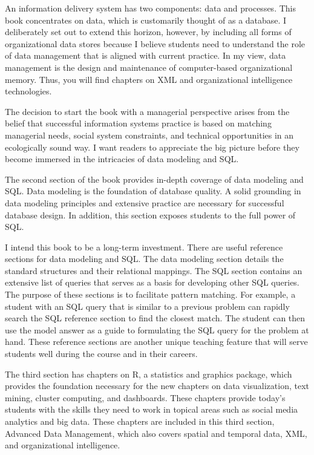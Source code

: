 \documentclass[
]{article}
\begin{document}
An information delivery system has two components: data and processes.
This book concentrates on data, which is customarily thought of as a
database. I deliberately set out to extend this horizon, however, by
including all forms of organizational data stores because I believe
students need to understand the role of data management that is aligned
with current practice. In my view, data management is the design and
maintenance of computer-based organizational memory. Thus, you will find
chapters on XML and organizational intelligence technologies.

The decision to start the book with a managerial perspective arises from
the belief that successful information systems practice is based on
matching managerial needs, social system constraints, and technical
opportunities in an ecologically sound way. I want readers to appreciate
the big picture before they become immersed in the intricacies of data
modeling and SQL.

The second section of the book provides in-depth coverage of data
modeling and SQL. Data modeling is the foundation of database quality. A
solid grounding in data modeling principles and extensive practice are
necessary for successful database design. In addition, this section
exposes students to the full power of SQL.

I intend this book to be a long-term investment. There are useful
reference sections for data modeling and SQL. The data modeling section
details the standard structures and their relational mappings. The SQL
section contains an extensive list of queries that serves as a basis for
developing other SQL queries. The purpose of these sections is to
facilitate pattern matching. For example, a student with an SQL query
that is similar to a previous problem can rapidly search the SQL
reference section to find the closest match. The student can then use
the model answer as a guide to formulating the SQL query for the problem
at hand. These reference sections are another unique teaching feature
that will serve students well during the course and in their careers.

The third section has chapters on R, a statistics and graphics package,
which provides the foundation necessary for the new chapters on data
visualization, text mining, cluster computing, and dashboards. These
chapters provide today's students with the skills they need to work in
topical areas such as social media analytics and big data. These
chapters are included in this third section, Advanced Data Management,
which also covers spatial and temporal data, XML, and organizational
intelligence.
\end{document}

